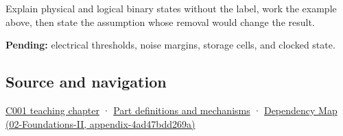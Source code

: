 Explain physical and logical binary states without the label, work the example above, then state the assumption whose removal would change the result.

\textbf{Pending:} electrical thresholds, noise margins, storage cells, and clocked state.

\subsection{Source and navigation}\label{appendix-ea798b1ceb35-source-and-navigation}

\hyperref[01-foundations-i-ch001-from-a-signal-to-an-interpretation]{C001 teaching chapter} · \hyperref[appendix-fd090d982a15]{Part definitions and mechanisms} · \href{../02-Foundations-II/main.pdf\#nameddest=appendix-4ad47bdd269a}{Dependency Map (02-Foundations-II, appendix-4ad47bdd269a)}
